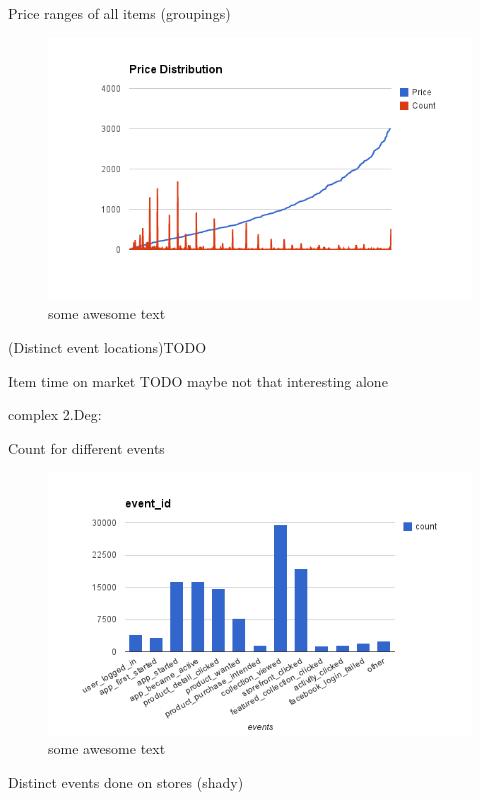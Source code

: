         Price ranges of all items (groupings)

\begin{figure}[H]
    \includegraphics[width=5in]{image/price_distr.png}
    \centering
    \caption[Price distribution of items]{some awesome text}
    \label{figure:ratingdistr}
\end{figure}

        (Distinct event locations)TODO

        Item time on market TODO maybe not that interesting alone


    complex 2.Deg:

        Count for different events

\begin{figure}[H]
    \includegraphics[width=5in]{image/event_id.png}
    \centering
    \caption[Count for different events]{some awesome text}
    \label{figure:ratingdistr}
\end{figure}

        Distinct events done on stores (shady)

